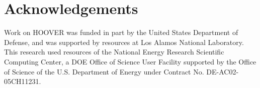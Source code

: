 \section{Acknowledgements}

Work on HOOVER was funded in part by the United States Department of
Defense, and was supported by resources at Los Alamos National
Laboratory. This research used resources of the National Energy Research
Scientific Computing Center, a DOE Office of Science User Facility supported by
the Office of Science of the U.S. Department of Energy under Contract No. DE-AC02-05CH11231.
